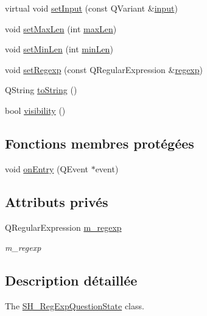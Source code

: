 \begin{DoxyCompactItemize}
\item 
virtual void \hyperlink{classSH__QuestionState_a331222d371d9c97392f35c84a5ef43e1}{set\-Input} (const Q\-Variant \&\hyperlink{classSH__InOutState_a04364c76d2fd8a3781e7b325955e5bd9}{input})
\item 
void \hyperlink{classSH__StringQuestionState_a8dbbcbc28c409a997fcb481cb47847c4}{set\-Max\-Len} (int \hyperlink{classSH__StringQuestionState_a51f49c3563bacbcc92ca7bed0631269e}{max\-Len})
\item 
void \hyperlink{classSH__StringQuestionState_a05b9d1eb5727461f34fea2f0857e33e1}{set\-Min\-Len} (int \hyperlink{classSH__StringQuestionState_a4f988ca17ec5e74db4ef1f83997606d9}{min\-Len})
\item 
void \hyperlink{classSH__RegExpQuestionState_af2d648d2bd8c3435d83c8e331bbbfcfb}{set\-Regexp} (const Q\-Regular\-Expression \&\hyperlink{classSH__RegExpQuestionState_a5fe3fd070e922885a127029ce2e80b6c}{regexp})
\item 
Q\-String \hyperlink{classSH__GenericState_a5480c5ee725fd801d8f6292cd4c803b8}{to\-String} ()
\item 
bool \hyperlink{classSH__InOutState_a8c496b2fe21a51a587c6e4409c0f37ec}{visibility} ()
\end{DoxyCompactItemize}
\subsection*{Fonctions membres protégées}
\begin{DoxyCompactItemize}
\item 
void \hyperlink{classSH__GenericState_a7c30692635023ce7cf65e5ba5bb18a9c}{on\-Entry} (Q\-Event $\ast$event)
\end{DoxyCompactItemize}
\subsection*{Attributs privés}
\begin{DoxyCompactItemize}
\item 
Q\-Regular\-Expression \hyperlink{classSH__RegExpQuestionState_a82543a3535f8dcb09942bfab8acf3323}{m\-\_\-regexp}
\begin{DoxyCompactList}\small\item\em m\-\_\-regexp \end{DoxyCompactList}\end{DoxyCompactItemize}


\subsection{Description détaillée}
The \hyperlink{classSH__RegExpQuestionState}{S\-H\-\_\-\-Reg\-Exp\-Question\-State} class. 

